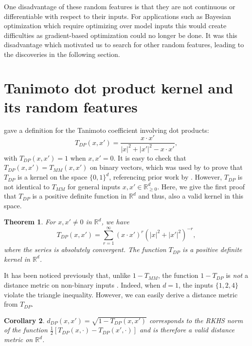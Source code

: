 \documentclass{article}
\theoremstyle{plain}
\newtheorem{theorem}{Theorem}[section]
\newtheorem{corollary}[theorem]{Corollary}
\theoremstyle{definition}
\theoremstyle{remark}
\newcommand{\R}{\mathbb{R}}
\begin{document}
One disadvantage of these random features
is that they are not continuous or differentiable with respect to their inputs.
For applications such as Bayesian optimization which require optimizing over model inputs
this would create difficulties as gradient-based optimization could no longer be done.
It was this disadvantage which motivated us to search for other random features,
leading to the discoveries in the following section.

\section{Tanimoto dot product kernel and its random features}\label{sec:t-dp}

\citet{ralaivola2005graph} gave a definition for the Tanimoto coefficient involving dot products:
\begin{equation}\label{eqn:tanidot-kernel}
    T_{DP}(x, x') = \frac{x\cdot x'}{|x|^2+|x'|^2-x\cdot x'}, %
\end{equation}
with $T_{DP}(x,x')=1$ when $x,x'=0$. It is easy to check that $T_{DP}(x,x')=T_{MM}(x,x')$ on binary vectors, which was used by \citet{ralaivola2005graph} to prove that $T_{DP}$ is a kernel on the space $\{0,1\}^d$, referencing prior work by \citet{gower1971general}.  However, $T_{DP}$ is not identical to $T_{MM}$ for general inputs $x,x'\in \R_{\ge 0}^d$. Here, we give the first proof that $T_{DP}$ is a positive definite function in $\R^d$ and thus, also a valid kernel in this space.

\begin{theorem}\label{thm:tdp-is-pd}
    For $x,x'\neq 0$ in $\R^d$, we have
    \begin{equation}\label{eqn:tanidot-power-series}
       T_{DP}(x,x')= \sum_{r=1}^\infty \left(x\cdot x'\right)^r \left(|x|^2+|x'|^2\right)^{-r},
    \end{equation}
    where the series is absolutely convergent. The function $T_{DP}$ is a positive definite kernel in $\R^d$.
\end{theorem}

It has been noticed previously that, unlike $1-T_{MM}$, the function $1-T_{DP}$ is \emph{not} a distance metric on non-binary inputs \citep{kosub2019note}. Indeed, when $d=1$, the inputs $\{1,2,4\}$   violate the triangle inequality. However, we can easily derive a distance metric from $T_{DP}$.

\begin{corollary}\label{thm:tdp-is-metric}
    $d_{DP}(x,x')=\sqrt{1-T_{DP}(x,x')}$ 
    corresponds to the RKHS norm of the function $\frac{1}{2}[T_{DP}(x,\cdot)-T_{DP}(x',\cdot)]$
    and is therefore a valid distance metric on $\mathbb{R}^d$.
\end{corollary}
\end{document}
